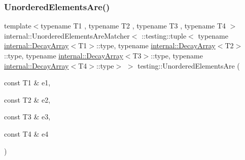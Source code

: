 \mbox{\label{namespacetesting_a8dfb2b88d0cacb8ececc069b0b015991}} 
\subsubsection{\texorpdfstring{UnorderedElementsAre()}{UnorderedElementsAre()}\hspace{0.1cm}{\footnotesize\ttfamily [5/11]}}
{\footnotesize\ttfamily template$<$typename T1 , typename T2 , typename T3 , typename T4 $>$ \\
internal\+::\+Unordered\+Elements\+Are\+Matcher$<$ \+::testing\+::tuple$<$ typename \mbox{\hyperlink{structtesting_1_1internal_1_1DecayArray}{internal\+::\+Decay\+Array}}$<$T1$>$\+::type, typename \mbox{\hyperlink{structtesting_1_1internal_1_1DecayArray}{internal\+::\+Decay\+Array}}$<$T2$>$\+::type, typename \mbox{\hyperlink{structtesting_1_1internal_1_1DecayArray}{internal\+::\+Decay\+Array}}$<$T3$>$\+::type, typename \mbox{\hyperlink{structtesting_1_1internal_1_1DecayArray}{internal\+::\+Decay\+Array}}$<$T4$>$\+::type$>$ $>$ testing\+::\+Unordered\+Elements\+Are (\begin{DoxyParamCaption}\item[{const T1 \&}]{e1,  }\item[{const T2 \&}]{e2,  }\item[{const T3 \&}]{e3,  }\item[{const T4 \&}]{e4 }\end{DoxyParamCaption})\hspace{0.3cm}{\ttfamily [inline]}}

\mbox{\label{namespacetesting_a5e0ff76eb3f61b6c79b60311ceca73d3}} 

